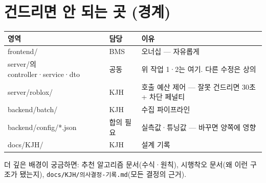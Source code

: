\documentclass[11pt]{article}
\begin{document}
\section{건드리면 안 되는 곳 (경계)}

\begin{center}
\begin{tabular}{lll}
\toprule
영역 & 담당 & 이유 \\
\midrule
frontend/ & BMS & 오너십 --- 자유롭게 \\
server/의 controller·service·dto & 공동 & 위 작업 1·2는 여기. 다른 수정은 상의 \\
server/roblox/ & KJH & 호출 예산 제어 --- 잘못 건드리면 30초+ 차단 페널티 \\
backend/batch/ & KJH & 수집 파이프라인 \\
backend/config/*.json & 합의 필요 & 실측값·튜닝값 --- 바꾸면 양쪽에 영향 \\
docs/KJH/ & KJH & 설계 기록 \\
\bottomrule
\end{tabular}
\end{center}

\bigskip
\noindent 더 깊은 배경이 궁금하면: 추천 알고리즘 문서(수식·원칙),
시행착오 문서(왜 이런 구조가 됐는지), \texttt{docs/KJH/의사결정-기록.md}(모든 결정의 근거).
\end{document}
